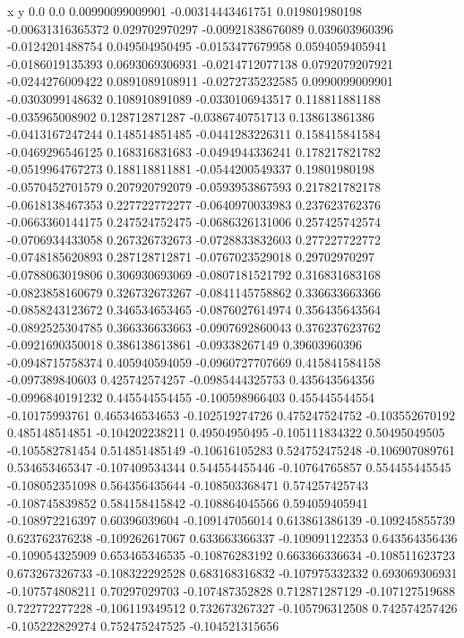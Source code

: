               x                y
            0.0              0.0
0.00990099009901  -0.00314443461751
 0.019801980198  -0.00631316365372
 0.029702970297  -0.00921838676089
 0.039603960396  -0.0124201488754
 0.049504950495  -0.0153477679958
0.0594059405941  -0.0186019135393
0.0693069306931  -0.0214712077138
0.0792079207921  -0.0244276009422
0.0891089108911  -0.0272735232585
0.0990099009901  -0.0303099148632
 0.108910891089  -0.0330106943517
 0.118811881188  -0.035965008902
 0.128712871287  -0.0386740751713
 0.138613861386  -0.0413167247244
 0.148514851485  -0.0441283226311
 0.158415841584  -0.0469296546125
 0.168316831683  -0.0494944336241
 0.178217821782  -0.0519964767273
 0.188118811881  -0.0544200549337
  0.19801980198  -0.0570452701579
 0.207920792079  -0.0593953867593
 0.217821782178  -0.0618138467353
 0.227722772277  -0.0640970033983
 0.237623762376  -0.0663360144175
 0.247524752475  -0.0686326131006
 0.257425742574  -0.0706934433058
 0.267326732673  -0.0728833832603
 0.277227722772  -0.0748185620893
 0.287128712871  -0.0767023529018
  0.29702970297  -0.0788063019806
 0.306930693069  -0.0807181521792
 0.316831683168  -0.0823858160679
 0.326732673267  -0.0841145758862
 0.336633663366  -0.0858243123672
 0.346534653465  -0.0876027614974
 0.356435643564  -0.0892525304785
 0.366336633663  -0.0907692860043
 0.376237623762  -0.0921690350018
 0.386138613861   -0.09338267149
  0.39603960396  -0.0948715758374
 0.405940594059  -0.0960727707669
 0.415841584158  -0.097389840603
 0.425742574257  -0.0985444325753
 0.435643564356  -0.0996840191232
 0.445544554455  -0.100598966403
 0.455445544554   -0.10175993761
 0.465346534653  -0.102519274726
 0.475247524752  -0.103552670192
 0.485148514851  -0.104202238211
  0.49504950495  -0.105111834322
  0.50495049505  -0.105582781454
 0.514851485149   -0.10616105283
 0.524752475248  -0.106907089761
 0.534653465347  -0.107409534344
 0.544554455446   -0.10764765857
 0.554455445545  -0.108052351098
 0.564356435644  -0.108503368471
 0.574257425743  -0.108745839852
 0.584158415842  -0.108864045566
 0.594059405941  -0.108972216397
  0.60396039604  -0.109147056014
 0.613861386139  -0.109245855739
 0.623762376238  -0.109262617067
 0.633663366337  -0.109091122353
 0.643564356436  -0.109054325909
 0.653465346535   -0.10876283192
 0.663366336634  -0.108511623723
 0.673267326733  -0.108322292528
 0.683168316832  -0.107975332332
 0.693069306931  -0.107574808211
  0.70297029703  -0.107487352828
 0.712871287129  -0.107127519688
 0.722772277228  -0.106119349512
 0.732673267327  -0.105796312508
 0.742574257426  -0.105222829274
 0.752475247525  -0.104521315656
